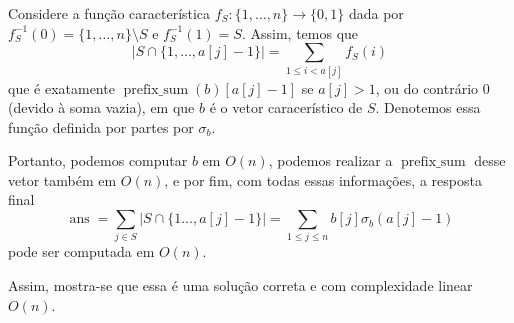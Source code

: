 \documentclass{article}
\begin{document}
Considere a função característica \(f_S: \{1, \dotsc, n\} \to \{0,1\}\) dada por \(f_S^{-1}(0) = \{1, \dotsc, n\} \setminus S\) e \(f_S^{-1}(1) = S\). Assim, temos que
\[|S \cap \{1, \dotsc, a[j] - 1\}| = \sum_{1 \leq i < a[j]}f_S(i)\]
que é exatamente \(\operatorname{prefix\_sum}(b)[a[j] - 1]\) se \(a[j] > 1\), ou do contrário \(0\) (devido à soma vazia), em que \(b\) é o vetor caracerístico de \(S\). Denotemos essa função definida por partes por \(\sigma_b\).  

Portanto, podemos computar \(b\) em \(O(n)\), podemos realizar a \(\operatorname{prefix\_sum}\) desse vetor também em \(O(n)\), e por fim, com todas essas informações, a resposta final 
\[\operatorname{ans} = \sum_{j \in S}|S \cap \{1 \dotsc, a[j] - 1\}| = \sum_{1 \leq j \leq n}b[j]\sigma_b(a[j] - 1)\]
pode ser computada em \(O(n)\).

Assim, mostra-se que essa é uma solução correta e com complexidade linear \(O(n)\).
\end{document}
